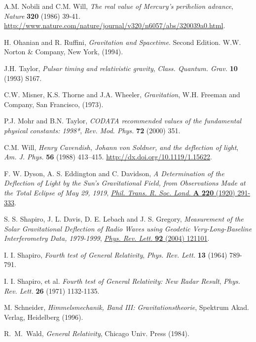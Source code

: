 \begin{thebibliography}{99}
 A.M. Nobili and C.M. Will, {\it The real value of Mercury's perihelion advance}, {\sl Nature} {\bf 320} (1986) 39-41. \url{http://www.nature.com/nature/journal/v320/n6057/abs/320039a0.html}.

 H. Ohanian and R. Ruffini, {\em Gravitation and Spacetime}. Second Edition. W.W. Norton \& Company, New York, (1994).

 J.H. Taylor, {\em Pulsar timing and relativistic gravity}, {\sl Class. Quantum. Grav.} {\bf 10}  (1993) S167.



 C.W. Misner, K.S. Thorne and J.A. Wheeler, {\em Gravitation},
W.H. Freeman and Company, San Francisco, (1973).

P.J. Mohr and B.N. Taylor, {\it CODATA recommended values of
the fundamental physical constants: 1998*}, {\sl Rev. Mod. Phys.} {\bf 72}
(2000) 351.

 C.M. Will, {\em Henry Cavendish, Johann von Soldner, and the deflection of light},  {\sl Am. J. Phys.} {\bf  56} (1988) 413--415. \url{http://dx.doi.org/10.1119/1.15622}.

F. W. Dyson, A. S. Eddington and C. Davidson, {\em A Determination of the Deflection of Light by the Sun's Gravitational Field, from Observations Made at the Total Eclipse of May 29, 1919}, \href{http://www.jstor.org/stable/91137}{{\sl Phil. Trans. R. Soc. Lond.} {\bf A 220} (1920) 291-333}.

 S. S. Shapiro, J. L. Davis, D. E. Lebach and J. S. Gregory, {\em Measurement of the Solar Gravitational Deflection of Radio Waves using Geodetic Very-Long-Baseline Interferometry Data, 1979-1999}, \href{http://link.aps.org/doi/10.1103/PhysRevLett.92.121101
}{{\sl Phys. Rev. Lett.} {\bf 92} (2004) 121101}.

 I. I. Shapiro,  {\em Fourth test of General Relativity}, {\sl Phys. Rev. Lett.} {\bf 13} (1964) 789-791.

 I. I. Shapiro, et al. {\em Fourth test of General Relativity: New Radar Result}, {\sl Phys. Rev. Lett.} {\bf 26} (1971) 1132-1135.

M. Schneider, {\em Himmelsmechanik, Band III:
Gravitationstheorie}, Spektrum Akad. Verlag, Heidelberg (1996).



 R.~M.~Wald, {\em General Relativity},  Chicago Univ. Press (1984).


\end{thebibliography}
